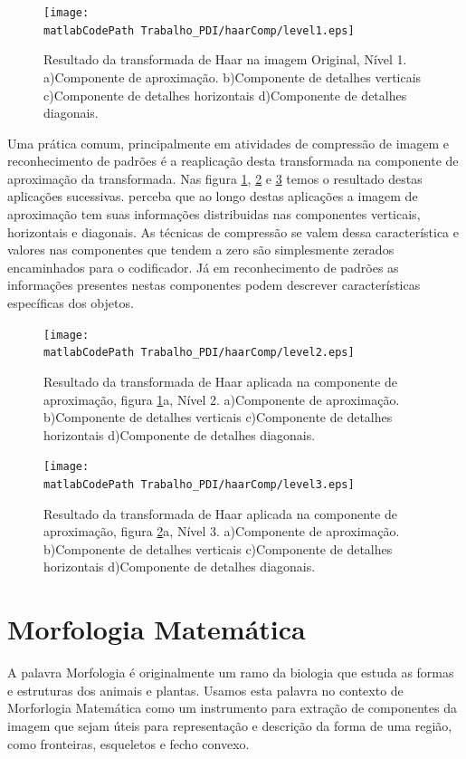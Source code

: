 \documentclass[
	article,			%
	11pt,				%
	oneside,			%
	a4paper,			%
	english,			%
	brazil,				%
	sumario=tradicional
	]{abntex2}
\newcommand{\matlabCodePath}{/home/clifte/git/Mestrado/Matlab/}
\begin{document}
\begin{figure} 
		\centering 
		\texttt{[image: \\matlabCodePath
		Trabalho\_PDI/haarComp/level1.eps]}
		\caption{Resultado da transformada de Haar na imagem Original, Nível 1.
		a)Componente de aproximação.
		b)Componente de detalhes verticais
		c)Componente de detalhes horizontais
		d)Componente de detalhes diagonais.
		}
		\label{fig:haarDec1}		
\end{figure}
Uma prática comum, principalmente em atividades de compressão de imagem e
reconhecimento de padrões é a reaplicação desta transformada na componente de
aproximação da transformada. Nas figura
\ref{fig:haarDec1}, \ref{fig:haarDec2} e \ref{fig:haarDec3} temos o resultado
destas aplicações sucessivas. perceba que ao longo destas aplicações a imagem de
aproximação tem suas informações distribuidas nas componentes verticais,
horizontais e diagonais. As técnicas de compressão se valem dessa característica
e valores nas componentes que tendem a zero são simplesmente zerados
encaminhados para o codificador. Já em reconhecimento de padrões as informações
presentes nestas componentes podem descrever características específicas dos
objetos.

\begin{figure} 
		\centering 
		\texttt{[image: \\matlabCodePath
		Trabalho\_PDI/haarComp/level2.eps]}
		\caption{Resultado da transformada de Haar aplicada na componente de
		aproximação, figura \ref{fig:haarDec1}a, Nível 2.
		a)Componente de aproximação.
		b)Componente de detalhes verticais
		c)Componente de detalhes horizontais
		d)Componente de detalhes diagonais.
		}
		\label{fig:haarDec2}		
\end{figure}


\begin{figure} 
		\centering 
		\texttt{[image: \\matlabCodePath
		Trabalho\_PDI/haarComp/level3.eps]}
		\caption{Resultado da transformada de Haar aplicada na componente de
		aproximação, figura \ref{fig:haarDec2}a, Nível 3.
		a)Componente de aproximação.
		b)Componente de detalhes verticais
		c)Componente de detalhes horizontais
		d)Componente de detalhes diagonais.
		}
		\label{fig:haarDec3}		
\end{figure}


\section{Morfologia Matemática}
A palavra Morfologia é originalmente um ramo da biologia que estuda as
formas e estruturas dos animais e plantas. Usamos esta palavra no contexto de
Morforlogia Matemática como um instrumento para extração de componentes
da imagem que sejam úteis para representação e descrição da forma de uma
região, como fronteiras, esqueletos e fecho convexo.
\end{document}
